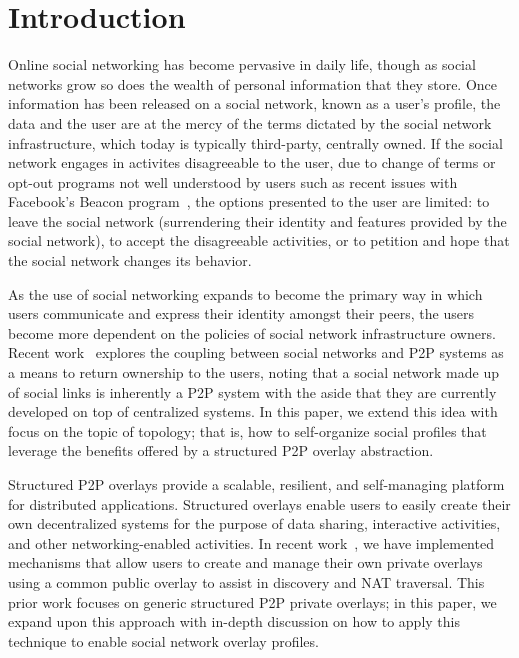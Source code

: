 \documentclass[letterpaper,twocolumn,10pt]{article}
\begin{document}
\section{Introduction}
Online social networking has become pervasive in daily life, though as social
networks grow so does the wealth of personal information that they store.  Once
information has been released on a social network, known as a user's profile,
the data and the user are at the mercy of the terms dictated by the social network 
infrastructure, which today is typically third-party, centrally owned.  If the social
network engages in activites disagreeable to the user, due to change of terms or opt-out programs not well understood by users such as recent issues
with Facebook's Beacon program~\cite{facebook_beacon}, the options presented to the user are limited:
to leave the social network (surrendering their identity and features provided
by the social network), to accept the disagreeable activities, or to petition
and hope that the social network changes its behavior. 

As the use of social networking expands to become the primary way in which users
communicate and express their identity amongst their peers, the users become
more dependent on the policies of social network infrastructure owners.  Recent
work~\cite{p2p_socialnetwork} explores the coupling between social networks and
P2P systems as a means to return ownership to the users, noting that a social
network made up of social links is inherently a P2P system with the aside that
they are currently developed on top of centralized systems.  In this paper, we
extend this idea with focus on the topic of topology; that is, how to self-organize
social profiles that leverage the benefits offered by a structured P2P overlay abstraction.

Structured P2P overlays provide a scalable, resilient, and self-managing
platform for distributed applications.  Structured overlays enable users to
easily create their own decentralized systems for the purpose of data sharing,
interactive activities, and other networking-enabled activities.  In recent
work~\cite{icdcs10}, we have implemented mechanisms that allow users to create
and manage their own private overlays using a common public overlay to assist
in discovery and NAT traversal. This prior work focuses on generic structured
P2P private overlays; in this paper, we
expand upon this approach with in-depth discussion on how to apply this technique to
enable social network overlay profiles.
\end{document}
